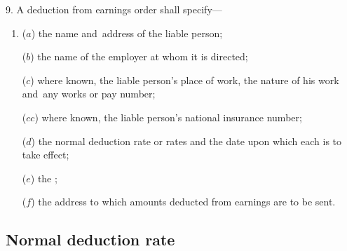 \documentclass[12pt,a4paper]{article}
\begin{document}
9.  A deduction from earnings order shall specify—
\begin{enumerate}\item[]
($a$) the name and~address of the liable person;

($b$) the name of the employer at whom it is directed;

($c$) where known, the liable person’s place of work, the nature of his work and~any works or pay number;

($cc$) where known, the liable person’s national insurance number;

%

($d$) the normal deduction rate or rates and the date upon which each is to take effect;

($e$) the 
;  %

($f$) the address to which amounts deducted from earnings are to be sent.
\end{enumerate}


\subsection[10. Normal deduction rate]{Normal deduction rate}
\end{document}

